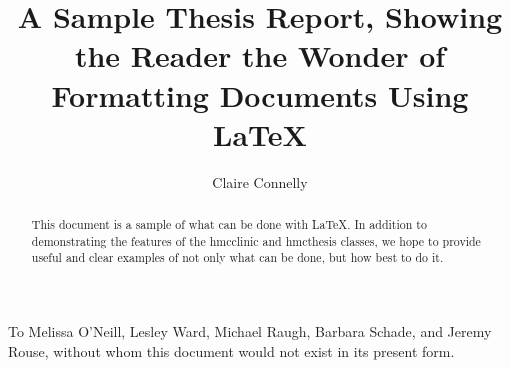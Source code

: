 \documentclass{hmcthesis}
\title{A Sample Thesis Report, Showing the Reader the Wonder of
  Formatting Documents Using \LaTeX}
\author{Claire Connelly}
\begin{document}
\frontmatter


\maketitle




\begin{abstract}
  This document is a sample of what can be done with \LaTeX.  In
  addition to demonstrating the features of the \textsf{hmcclinic}
  and \textsf{hmcthesis} classes, we hope to provide useful and
  clear examples of not only what can be done, but how best to do it.
\end{abstract}




\begin{acknowledgments}
  To Melissa O'Neill, Lesley Ward, Michael Raugh, Barbara Schade,
  and Jeremy Rouse, without whom this document would not exist in
  its present form.
\end{acknowledgments}




\end{document}
